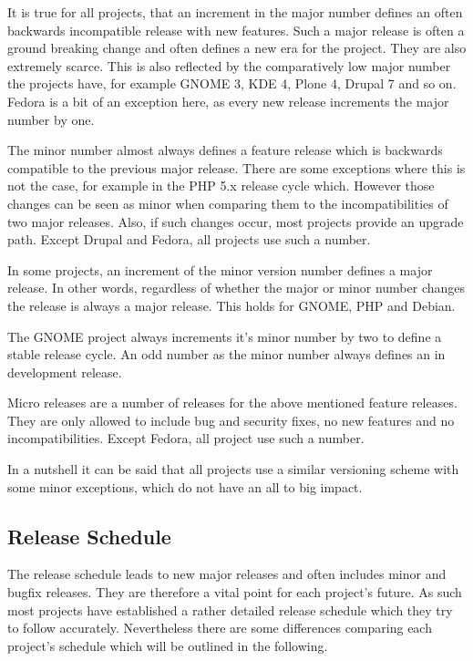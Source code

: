 It is true for all projects, that an increment in the major number defines an
often backwards incompatible release with new features. Such a major release is
often a ground breaking change and often defines a new era for the project.
They are also extremely scarce. This is also reflected by the comparatively low
major number the projects have, for example GNOME 3, KDE 4, Plone 4, Drupal 7
and so on. Fedora is a bit of an exception here, as every new release
increments the major number by one.

The minor number almost always defines a feature release which is backwards
compatible to the previous major release. There are some exceptions where this
is not the case, for example in the PHP 5.x release cycle which. However those
changes can be seen as minor when comparing them to the incompatibilities of
two major releases. Also, if such changes occur, most projects provide an
upgrade path. Except Drupal and Fedora, all projects use such a number.

In some projects, an increment of the minor version number defines a major
release. In other words, regardless of whether the major or minor number
changes the release is always a major release. This holds for GNOME, PHP and
Debian.

The GNOME project always increments it's minor number by two to define a stable
release cycle. An odd number as the minor number always defines an in
development release.

Micro releases are a number of releases for the above mentioned feature
releases. They are only allowed to include bug and security fixes, no new
features and no incompatibilities. Except Fedora, all project use such a
number.

In a nutshell it can be said that all projects use a similar versioning scheme
with some minor exceptions, which do not have an all to big impact.


\subsection{Release Schedule} %

The release schedule leads to new major releases and often includes minor and
bugfix releases. They are therefore a vital point for each project's future. As
such most projects have established a rather detailed release schedule which
they try to follow accurately. Nevertheless there are some differences
comparing each project's schedule which will be outlined in the following.


